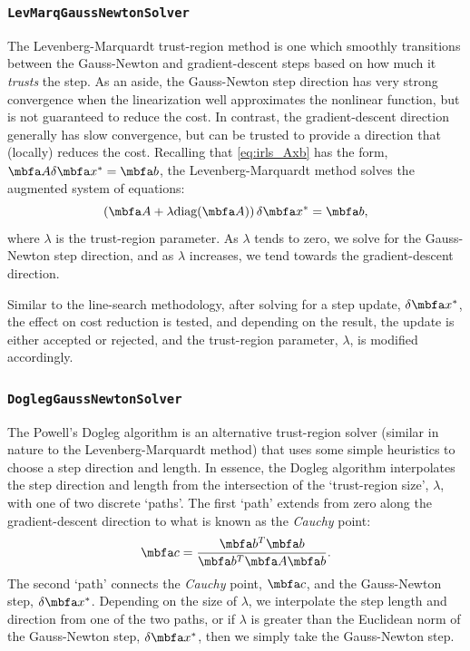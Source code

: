 \documentclass[10pt,letterpaper,fleqn,oneside]{article}
\newcommand{\code}[1]{\texttt{#1}}
\begin{document}
\subsubsection{\code{LevMarqGaussNewtonSolver}}

The Levenberg-Marquardt trust-region method is one which smoothly transitions between the Gauss-Newton and gradient-descent steps based on how much it \emph{trusts} the step.
As an aside, the Gauss-Newton step direction has very strong convergence when the linearization well approximates the nonlinear function, but is not guaranteed to reduce the cost. 
In contrast, the gradient-descent direction generally has slow convergence, but can be trusted to provide a direction that (locally) reduces the cost.
Recalling that \eqref{eq:irls_Axb} has the form, $\mbf{A} \delta\mbf{x}^* = \mbf{b}$, the Levenberg-Marquardt method solves the augmented system of equations:
%
\begin{equation}
(\mbf{A} + \lambda \diag(\mbf{A})) \, \delta\mbf{x}^* = \mbf{b},
\end{equation}
%
where $\lambda$ is the trust-region parameter.
As $\lambda$ tends to zero, we solve for the Gauss-Newton step direction, and as $\lambda$ increases, we tend towards the gradient-descent direction.

Similar to the line-search methodology, after solving for a step update, $\delta\mbf{x}^*$, the effect on cost reduction is tested, and depending on the result, the update is either accepted or rejected, and the trust-region parameter, $\lambda$, is modified accordingly.

\subsubsection{\code{DoglegGaussNewtonSolver}}

The Powell's Dogleg algorithm is an alternative trust-region solver (similar in nature to the Levenberg-Marquardt method) that uses some simple heuristics to choose a step direction and length.
In essence, the Dogleg algorithm interpolates the step direction and length from the intersection of the `trust-region size', $\lambda$, with one of two discrete `paths'.
The first `path' extends from zero along the gradient-descent direction to what is known as the \emph{Cauchy} point:
%
\begin{equation}
\mbf{c} = \dfrac{\mbf{b}^T \mbf{b}}{\mbf{b}^T \mbf{A} \mbf{b}}.
\end{equation}
%
The second `path' connects the \emph{Cauchy} point, $\mbf{c}$, and the Gauss-Newton step, $\delta\mbf{x}^*$.
Depending on the size of $\lambda$, we interpolate the step length and direction from one of the two paths, or if $\lambda$ is greater than the Euclidean norm of the Gauss-Newton step, $\delta\mbf{x}^*$, then we simply take the Gauss-Newton step.
\end{document}
